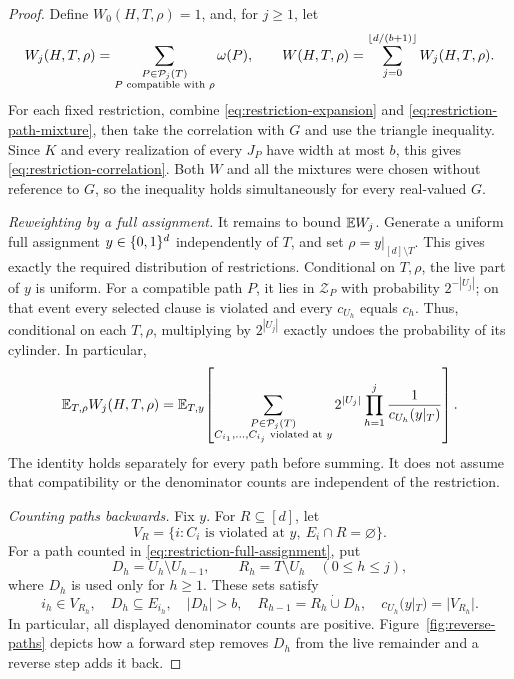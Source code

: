 \begin{proof}
Define $W_0(H,T,\rho)=1$, and, for $j\geq1$, let
\begin{equation}\label{eq:restriction-W}
 W_j(H,T,\rho)=
      \sum_{\substack{P\in\mathcal P_j(T)\\P\text{ compatible with }\rho}}
                \omega(P),
 \qquad
 W(H,T,\rho)=\sum_{j=0}^{\left\lfloor d/(b+1)\right\rfloor}W_j(H,T,\rho).
\end{equation}
For each fixed restriction, combine \eqref{eq:restriction-expansion} and
\eqref{eq:restriction-path-mixture}, then take the correlation with $G$
and use the triangle inequality.  Since $K$ and every realization of every
$J_P$ have width at most $b$, this gives
\eqref{eq:restriction-correlation}.  Both $W$ and all the mixtures were
chosen without reference to $G$, so the inequality holds simultaneously
for every real-valued $G$.

\medskip\noindent
\textit{Reweighting by a full assignment.}
It remains to bound $\mathbb E W_j$.  Generate a uniform full assignment
$y\in\{0,1\}^d$ independently of $T$, and set $\rho=y|_{[d]\setminus T}$.
This gives exactly the required distribution of restrictions.
Conditional on $T,\rho$, the live part of $y$ is uniform.  For a compatible
path $P$, it lies in $\mathcal Z_P$ with probability $2^{-|U_j|}$; on that
event every selected clause is violated and every $c_{U_h}$ equals $c_h$.
Thus, conditional on each $T,\rho$, multiplying by $2^{|U_j|}$ exactly
undoes the probability of its cylinder.  In particular,
\begin{equation}\label{eq:restriction-full-assignment}
 \mathbb E_{T,\rho} W_j(H,T,\rho)
  =\mathbb E_{T,y}\!\left[
      \sum_{\substack{P\in\mathcal P_j(T)\\
                      C_{i_1},\ldots,C_{i_j}\text{ violated at }y}}
        2^{|U_j|}\prod_{h=1}^{j}\frac{1}{c_{U_h}(y|_T)}
                 \right].
\end{equation}
The identity holds separately for every path before summing.  It does not
assume that compatibility or the denominator counts are independent of
the restriction.

\medskip\noindent
\textit{Counting paths backwards.}
Fix $y$.  For $R\subseteq[d]$, let
\[
   V_R=\{i:C_i\text{ is violated at }y,\ E_i\cap R=\varnothing\}.
\]
For a path counted in \eqref{eq:restriction-full-assignment}, put
\begin{equation}\label{eq:restriction-reverse-state}
   D_h=U_h\setminus U_{h-1},\qquad
   R_h=T\setminus U_h \quad(0\leq h\leq j),
\end{equation}
where $D_h$ is used only for $h\geq1$.  These sets satisfy
\begin{equation}\label{eq:restriction-reverse-properties}
  i_h\in V_{R_h},\quad D_h\subseteq E_{i_h},\quad |D_h|>b,
  \quad R_{h-1}=R_h\mathbin{\dot\cup}D_h,
  \quad c_{U_h}(y|_T)=|V_{R_h}|.
\end{equation}
In particular, all displayed denominator counts are positive.
Figure~\ref{fig:reverse-paths} depicts how a forward step removes $D_h$
from the live remainder and a reverse step adds it back.


\end{proof}
